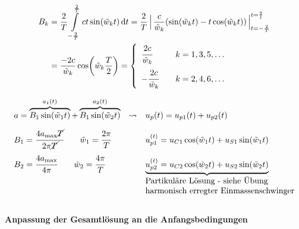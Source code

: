\begin{solution}
\begin{align*}
     B_k &= \frac{2}{T} \int\limits_{-\frac{2}{T}}^{\frac{2}{T}} ct \sin(\tilde{w}_k t) \dd{t} = \frac{2}{T}\,\Big|\, \frac{c}{\tilde{w}_k}(\sin(\tilde{w}_k t)-t\cos(\tilde{w}_k t))\,\Big|_{t={-\frac{2}{T}}}^{t=\frac{2}{t}} \\
     &= \frac{-2c}{\tilde{w}_k} \cos(\tilde{w}_k\frac{T}{2}) =
     \left\{
     \begin{array}{lll}
     \cfrac{2c}{\tilde{w}_k} & &k = 1,3,5,\dots\\[1em]
     -\cfrac{2c}{\tilde{w}_k} & &k = 2,4,6,\dots
     \end{array}\right.
\end{align*}

\begin{align*}
     \begin{array}{lcl}
        a = \overbrace{B_1\sin(\tilde{w}_1 t)}^{a_1(t)} + \overbrace{B_1\sin(\tilde{w}_2 t)}^{a_2(t)} & \rightsquigarrow & u_p(t) = u_{p1}(t) + u_{p2}(t) \\[1em]
        B_1 = \cfrac{4a_{\max}\cancel{T}}{2\pi\cancel{T}} \qquad \tilde{w}_1 = \cfrac{2\pi}{T} && u_{p1}^{(t)} = u_{C1} \cos(\tilde{w}_1 t) + u_{S1} \sin(\tilde{w}_1 t) \\[1em]
        B_2 = \cfrac{4a_{\max}}{4\pi} \qquad \tilde{w}_2 = \cfrac{4\pi}{T}&& \underbrace{u_{p2}^{(t)} = u_{C2} \cos(\tilde{w}_2 t) + u_{S2} \sin(\tilde{w}_2 t)} \\
        &&\text{Partikuläre Lösung - siehe Übung}\\
        &&\text{harmonisch erregter Einmassenschwinger}
    \end{array}
\end{align*}\\[2em]

\textbf{Anpassung der Gesamtlösung an die Anfangsbedingungen}
    

\end{solution}

